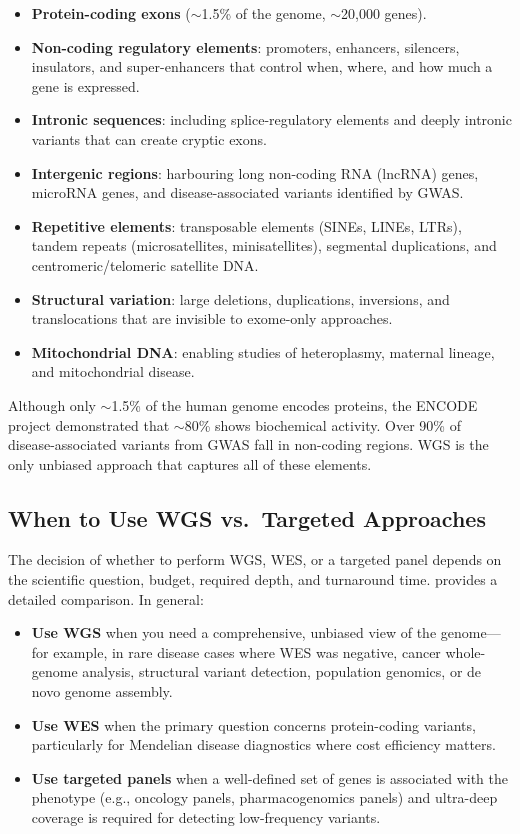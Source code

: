\begin{itemize}[nosep]
  \item \textbf{Protein-coding exons} ($\sim$1.5\% of the genome, $\sim$20,000 genes).
  \item \textbf{Non-coding regulatory elements}: promoters, enhancers, silencers, insulators, and super-enhancers that control when, where, and how much a gene is expressed.
  \item \textbf{Intronic sequences}: including splice-regulatory elements and deeply intronic variants that can create cryptic exons.
  \item \textbf{Intergenic regions}: harbouring long non-coding RNA (lncRNA) genes, microRNA genes, and disease-associated variants identified by GWAS.
  \item \textbf{Repetitive elements}: transposable elements (SINEs, LINEs, LTRs), tandem repeats (microsatellites, minisatellites), segmental duplications, and centromeric/telomeric satellite DNA.
  \item \textbf{Structural variation}: large deletions, duplications, inversions, and translocations that are invisible to exome-only approaches.
  \item \textbf{Mitochondrial DNA}: enabling studies of heteroplasmy, maternal lineage, and mitochondrial disease.
\end{itemize}

\begin{keyconcept}[title={Why the Non-Coding Genome Matters}]
Although only $\sim$1.5\% of the human genome encodes proteins, the ENCODE project demonstrated that $\sim$80\% shows biochemical activity. Over 90\% of disease-associated variants from GWAS fall in non-coding regions. WGS is the only unbiased approach that captures all of these elements.
\end{keyconcept}

\subsection{When to Use WGS vs.\ Targeted Approaches}

The decision of whether to perform WGS, WES, or a targeted panel depends on the scientific question, budget, required depth, and turnaround time.  provides a detailed comparison. In general:

\begin{itemize}[nosep]
  \item \textbf{Use WGS} when you need a comprehensive, unbiased view of the genome---for example, in rare disease cases where WES was negative, cancer whole-genome analysis, structural variant detection, population genomics, or de novo genome assembly.
  \item \textbf{Use WES} when the primary question concerns protein-coding variants, particularly for Mendelian disease diagnostics where cost efficiency matters.
  \item \textbf{Use targeted panels} when a well-defined set of genes is associated with the phenotype (e.g., oncology panels, pharmacogenomics panels) and ultra-deep coverage is required for detecting low-frequency variants.
\end{itemize}


